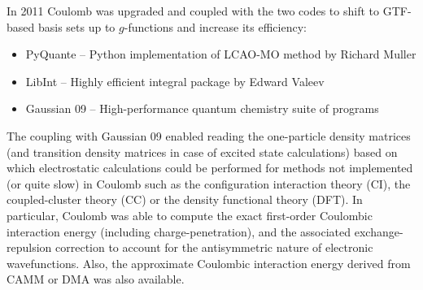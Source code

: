 \documentclass[a4paper,titlepage,twoside,fleqn,12pt]{book}
\begin{document}
\begin{refsection}
In 2011 {\sc Coulomb} was upgraded and coupled with the two codes to shift to GTF\hyp{}based
basis sets up to $g$-functions and increase its efficiency:
%
\begin{itemize}
\item {\sc PyQuante} -- Python implementation of LCAO-MO method by Richard Muller \citep{Muller.PyQuante.2009}
\item {\sc LibInt} -- Highly efficient integral package by Edward Valeev \citep{Valeev.LibInt.2013}
\item {\sc Gaussian 09} -- High\hyp{}performance quantum chemistry suite of programs \citep{Frisch.Gaussian.2009}
\end{itemize}
%
The coupling with {\sc Gaussian 09} \citep{Frisch.Gaussian.2009} 
enabled reading the one\hyp{}particle 
density matrices (and transition density matrices in case of excited state
calculations) based on which electrostatic calculations could be performed
for methods not implemented (or quite slow) in {\sc Coulomb} such as the 
configuration interaction theory (CI), the
coupled\hyp{}cluster theory (CC) or the density functional theory (DFT).
In particular, {\sc Coulomb} was able to compute the exact first\hyp{}order
Coulombic interaction energy (including charge\hyp{}penetration),
and the associated exchange\hyp{}repulsion correction to account
for the antisymmetric nature of electronic wavefunctions.
Also, the
approximate Coulombic interaction energy derived from CAMM or DMA
was also available.


\end{refsection}
\end{document}
